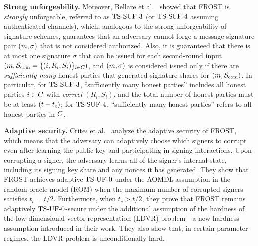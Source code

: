 \medskip
\textbf{Strong unforgeability.} Moreover, Bellare et al.~\cite{BellareCKMTZ22} showed that FROST is \emph{strongly} unforgeable, referred to as $\mathrm{TS}\mbox{-}\mathrm{SUF}\mbox{-}{3}$ (or $\mathrm{TS}\mbox{-}\mathrm{SUF}\mbox{-}{4}$ assuming authenticated channels), which, analogous to the strong unforgeability of signature schemes, guarantees that an adversary cannot forge a message-signature pair $(m,\sigma)$ that is not considered  authorized.
Also, it is guaranteed that there is at most one signature $\sigma$ that can be issued for each second-round input $(m, \mathcal{S}_{\rm com}=\{ (i, R_{i}, S_{i})\}_{i \in C})$, and $(m, \sigma)$ is considered issued only if there are \emph{sufficiently many} honest parties that generated signature shares for $(m, \mathcal{S}_{\rm com})$.
In particular, for $\mathrm{TS}\mbox{-}\mathrm{SUF}\mbox{-}{3}$, ``sufficiently many honest parties'' includes all honest parties $i\in C$ with \emph{correct} $(R_{i}, S_{i})$, and the total number of honest parties must be at least $(t - t_c)$; for $\mathrm{TS}\mbox{-}\mathrm{SUF}\mbox{-}{4}$, ``sufficiently many honest parties'' refers to all honest parties in $C$.

\medskip
\textbf{Adaptive security.} Crites et al.~\cite{adp-frost} analyze the adaptive security of FROST, which means that the adversary can adaptively choose which signers to corrupt even after learning the public key and participating in signing interactions. Upon corrupting a signer, the adversary learns all of the signer's internal state, including its signing key share and any nonces it has generated. They show that FROST achieves adaptive $\mathrm{TS}\mbox{-}\mathrm{UF}\mbox{-}{0}$ under the AOMDL assumption in the random oracle model (ROM) when the maximum number of corrupted signers satisfies $t_c = t/2$. Furthermore, when $t_c > t/2$, they prove that FROST remains adaptively $\mathrm{TS}\mbox{-}\mathrm{UF}\mbox{-}{0}$-secure under the additional assumption of the hardness of the low-dimensional vector representation (LDVR) problem—a new hardness assumption introduced in their work. They also show that, in certain parameter regimes, the LDVR problem is unconditionally hard.



